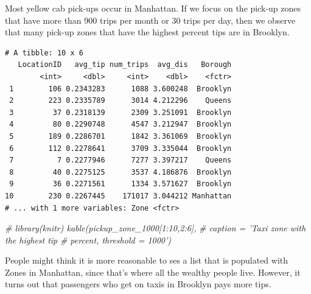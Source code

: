 \documentclass[12pt,twoside]{reedthesis}
\newenvironment{Shaded}{\begin{snugshade}}{\end{snugshade}}
\newcommand{\KeywordTok}[1]{\textcolor[rgb]{0.13,0.29,0.53}{\textbf{#1}}}
\newcommand{\DecValTok}[1]{\textcolor[rgb]{0.00,0.00,0.81}{#1}}
\newcommand{\StringTok}[1]{\textcolor[rgb]{0.31,0.60,0.02}{#1}}
\newcommand{\CommentTok}[1]{\textcolor[rgb]{0.56,0.35,0.01}{\textit{#1}}}
\newcommand{\OperatorTok}[1]{\textcolor[rgb]{0.81,0.36,0.00}{\textbf{#1}}}
\newcommand{\NormalTok}[1]{#1}
\theoremstyle{definition}
\theoremstyle{definition}
\theoremstyle{definition}
\theoremstyle{remark}
\begin{document}
Most yellow cab pick-ups occur in Manhattan. If we focus on the pick-up
zones that have more than 900 trips per month or 30 trips per day, then
we observe that many pick-up zones that have the highest percent tips
are in Brooklyn.
\begin{Shaded}
\end{Shaded}
\begin{verbatim}
# A tibble: 10 x 6
   LocationID   avg_tip num_trips  avg_dis   Borough
        <int>     <dbl>     <int>    <dbl>    <fctr>
 1        106 0.2343283      1088 3.600248  Brooklyn
 2        223 0.2335789      3014 4.212296    Queens
 3         37 0.2318139      2309 3.251091  Brooklyn
 4         80 0.2290748      4547 3.212947  Brooklyn
 5        189 0.2286701      1842 3.361069  Brooklyn
 6        112 0.2278641      3709 3.335044  Brooklyn
 7          7 0.2277946      7277 3.397217    Queens
 8         40 0.2275125      3537 4.186876  Brooklyn
 9         36 0.2271561      1334 3.571627  Brooklyn
10        230 0.2267445    171017 3.044212 Manhattan
# ... with 1 more variables: Zone <fctr>
\end{verbatim}
\begin{Shaded}
\begin{Highlighting}[]
\CommentTok{# library(knitr) kable(pickup_zone_1000[1:10,2:6],}
\CommentTok{# caption = 'Taxi zone with the highest tip}
\CommentTok{# percent, threshold = 1000')}
\end{Highlighting}
\end{Shaded}
People might think it is more reasonable to ses a list that is populated
with Zones in Manhattan, since that's where all the wealthy people live.
However, it turns out that passengers who get on taxis in Brooklyn pays
more tips.
\end{document}
